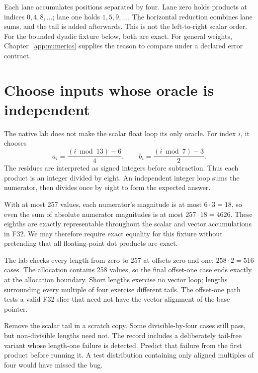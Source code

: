 Each lane accumulates positions separated by four. Lane zero
holds products at indices $0,4,8,\ldots$; lane one holds
$1,5,9,\ldots$. The horizontal reduction combines lane sums,
and the tail is added afterwards. This is not the left-to-right
scalar order. For the bounded dyadic fixture below, both are
exact. For general weights, Chapter~\ref{app:numerics} supplies
the reason to compare under a declared error contract.


\section{Choose inputs whose oracle is independent}
The native lab does not make the scalar float loop its only
oracle. For index $i$, it chooses
\[
 a_i=\frac{(i\bmod13)-6}{4},\qquad
 b_i=\frac{(i\bmod7)-3}{2}.
\]
The residues are interpreted as signed integers before subtraction.
Thus each product is an integer divided by eight. An independent
integer loop sums the numerator, then divides once by eight
to form the expected answer.

With at most 257 values, each numerator's magnitude is at
most $6\cdot3=18$, so even the sum of absolute numerator
magnitudes is at most $257\cdot18=4626$. These eighths are
exactly representable throughout the scalar and vector
accumulations in F32. We may therefore require exact equality
for this fixture without pretending that all floating-point
dot products are exact.

The lab checks every length from zero to 257 at offsets zero
and one: $258\cdot2=516$ cases. The allocation contains 258
values, so the final offset-one case ends exactly at the
allocation boundary. Short lengths exercise no vector loop;
lengths surrounding every multiple of four exercise different
tails. The offset-one path tests a valid F32 slice that need
not have the vector alignment of the base pointer.

Remove the scalar tail in a scratch copy. Some divisible-by-four
cases still pass, but non-divisible lengths need not. The
record includes a deliberately tail-free variant whose
length-one failure is detected. Predict that failure from
the first product before running it. A test distribution
containing only aligned multiples of four would have missed
the bug.

